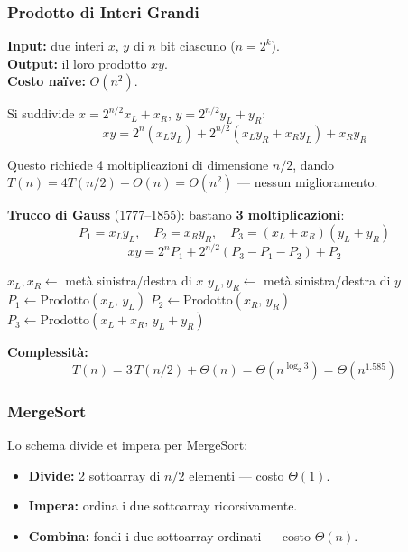 \subsubsection{Prodotto di Interi Grandi}

\begin{definizione}
	\textbf{Input:} due interi $x$, $y$ di $n$ bit ciascuno ($n = 2^k$).\\
	\textbf{Output:} il loro prodotto $xy$.\\
	\textbf{Costo naïve:} $O(n^2)$.
\end{definizione}

Si suddivide $x = 2^{n/2}x_L + x_R$, $y = 2^{n/2}y_L + y_R$:
\[
xy = 2^n(x_L y_L) + 2^{n/2}(x_L y_R + x_R y_L) + x_R y_R
\]

Questo richiede 4 moltiplicazioni di dimensione $n/2$, dando
$T(n) = 4T(n/2) + O(n) = O(n^2)$ — nessun miglioramento.

\begin{hardnote}
	\textbf{Trucco di Gauss} (1777--1855): bastano \textbf{3 moltiplicazioni}:
	\[
	P_1 = x_L y_L,\quad P_2 = x_R y_R,\quad
	P_3 = (x_L+x_R)(y_L+y_R)
	\]
	\[
	xy = 2^n P_1 + 2^{n/2}(P_3 - P_1 - P_2) + P_2
	\]
\end{hardnote}

\begin{algorithm}[H]
	\caption{Prodotto($x$, $y$)}
	$x_L, x_R \gets$ metà sinistra/destra di $x$
	$y_L, y_R \gets$ metà sinistra/destra di $y$\;
	$P_1 \gets \text{Prodotto}(x_L,\,y_L)$\;
	$P_2 \gets \text{Prodotto}(x_R,\,y_R)$
	$P_3 \gets \text{Prodotto}(x_L+x_R,\,y_L+y_R)$\;
\end{algorithm}

\begin{softnote}
	\textbf{Complessità:}
	\[
	T(n) = 3\,T(n/2) + \Theta(n) = \Theta(n^{\log_2 3})
	= \Theta(n^{1.585})
	\]
\end{softnote}

\subsubsection{MergeSort}

Lo schema divide et impera per MergeSort:
\begin{itemize}
	\item \textbf{Divide:} 2 sottoarray di $n/2$ elementi — costo $\Theta(1)$.
	\item \textbf{Impera:} ordina i due sottoarray ricorsivamente.
	\item \textbf{Combina:} fondi i due sottoarray ordinati — costo $\Theta(n)$.
\end{itemize}

